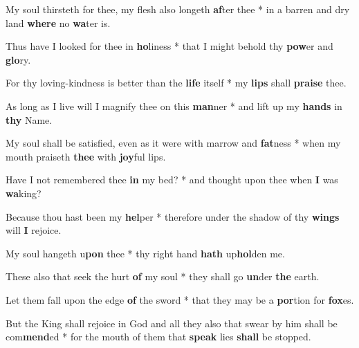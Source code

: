 \begin{multicols}{2}
	My soul thirsteth for thee, my flesh also longeth \textbf{af}ter thee * in a barren and dry land \textbf{where} no \textbf{wa}ter is.

	Thus have I looked for thee in \textbf{ho}liness * that I might behold thy \textbf{pow}er and \textbf{glo}ry.
	
	For thy loving-kindness is better than the \textbf{life} itself * my \textbf{lips} shall \textbf{praise} thee.
	
	As long as I live will I magnify thee on this \textbf{man}ner * and lift up my \textbf{hands} in \textbf{thy} Name.
	
	My soul shall be satisfied, even as it were with marrow and \textbf{fat}ness * when my mouth praiseth \textbf{thee} with \textbf{joy}ful lips.
	
	Have I not remembered thee \textbf{in} my bed? * and thought upon thee when \textbf{I} was \textbf{wa}king?
	
	Because thou hast been my \textbf{hel}per * therefore under the shadow of thy \textbf{wings} will \textbf{I} rejoice.
	
	My soul hangeth u\textbf{pon} thee * thy right hand \textbf{hath} up\textbf{hol}den me.
	
	These also that seek the hurt \textbf{of} my soul * they shall go \textbf{un}der \textbf{the} earth.
	
	Let them fall upon the edge \textbf{of} the sword * that they may be a \textbf{por}tion for \textbf{fox}es.
	
	But the King shall rejoice in God and all they also that swear by him shall be com\textbf{mend}ed * for the mouth of them that \textbf{speak} lies \textbf{shall} be stopped.
\end{multicols}